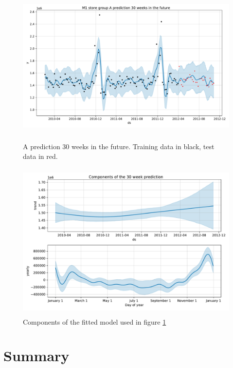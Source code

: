 \documentclass[english, 12pt, a4paper, sci, utf8, a-1b, online]{aaltothesis}
\begin{document}
\begin{figure}[htb]
	\centering
	\includegraphics[height=8cm]{../plots/forecasts/30_weeks_prediction_demo.pdf}
	\caption{A prediction 30 weeks in the future. Training data in black, test data in red.}
	\label{fig:prediction_demo}
\end{figure}

\begin{figure}[htb]
	\centering
	\includegraphics[height=8cm]{../plots/forecasts/30_weeks_prediction_components_demo.pdf}
	\caption{Components of the fitted model used in figure \ref{fig:prediction_demo}}
	\label{fig:prediction_components_demo}
\end{figure}





\section{Summary} 
\end{document}
